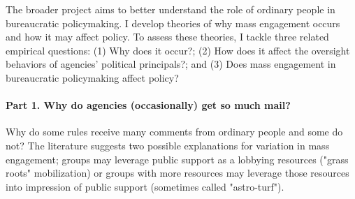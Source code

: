 The broader project aims to better understand the role of ordinary people in bureaucratic policymaking. 
I develop theories of why mass engagement occurs and how it may affect policy. To assess these theories, I tackle three related empirical questions: (1) Why does it occur?; (2) How does it affect the oversight behaviors of agencies' political principals?; and %
(3)  Does mass engagement in bureaucratic policymaking affect policy?

\paragraph{Part 1. Why do agencies (occasionally) get so much mail?} %
Why do some rules receive many comments from ordinary people and some do not?
The literature suggests two possible explanations for variation in mass engagement; groups may leverage public support as a lobbying resources ("grass roots" mobilization) or groups with more resources may leverage those resources into impression of public support (sometimes called "astro-turf").
